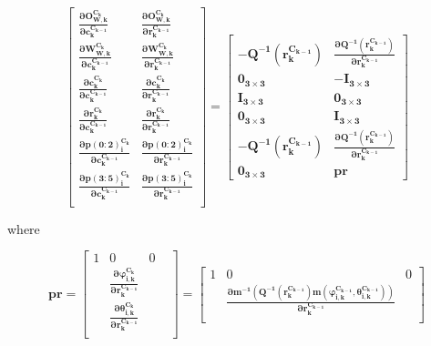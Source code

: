 \begin{equation}
\begin{bmatrix}
\boldsymbol{\frac{\partial O_{W,k}^{C_{k}}}{\partial c_{k}^{C_{k-1}}}} & 
\boldsymbol{\frac{\partial O_{W,k}^{C_{k}}}{\partial r_{k}^{C_{k-1}}}} \\
\boldsymbol{\frac{\partial W_{W,k}^{C_{k}}}{\partial c_{k}^{C_{k-1}}}} &
\boldsymbol{\frac{\partial W_{W,k}^{C_{k}}}{\partial r_{k}^{C_{k-1}}}} \\
\boldsymbol{\frac{\partial c_{k}^{C_{k}}}{\partial c_{k}^{C_{k-1}}}} & 
\boldsymbol{\frac{\partial c_{k}^{C_{k}}}{\partial r_{k}^{C_{k-1}}}} \\
\boldsymbol{\frac{\partial r_{k}^{C_{k}}}{\partial c_{k}^{C_{k-1}}}} & 
\boldsymbol{\frac{\partial r_{k}^{C_{k}}}{\partial r_{k}^{C_{k-1}}}} \\
\boldsymbol{\frac{\partial p(0:2)_{i}^{C_{k}}}{\partial c_{k}^{C_{k-1}}}} & 
\boldsymbol{\frac{\partial p(0:2)_{i}^{C_{k}}}{\partial r_{k}^{C_{k-1}}}} \\
\boldsymbol{\frac{\partial p(3:5)_{i}^{C_{k}}}{\partial c_{k}^{C_{k-1}}}} & 
\boldsymbol{\frac{\partial p(3:5)_{i}^{C_{k}}}{\partial r_{k}^{C_{k-1}}}} \\
\end{bmatrix}= \begin{bmatrix}
-\boldsymbol{Q^{-1}(r_{k}^{C_{k-1}})} & 
\boldsymbol{\frac{\partial Q^{-1}(r_{k}^{C_{k-1}})}{\partial r_{k}^{C_{k-1}}}} \\
\boldsymbol{0_{3\times 3}} & -\boldsymbol{I_{3\times 3}} \\
\boldsymbol{I_{3\times 3}} & \boldsymbol{0_{3\times 3}} \\
\boldsymbol{0_{3\times 3}} & \boldsymbol{I_{3\times 3}} \\
\boldsymbol{-Q^{-1}(r_{k}^{C_{k-1}})} & 
\boldsymbol{\frac{\partial Q^{-1}(r_{k}^{C_{k-1}})}{\partial r_{k}^{C_{k-1}}}} \\
\boldsymbol{0_{3\times 3}} & \boldsymbol{pr} 
\end{bmatrix}
\end{equation}

\noindent where

\begin{equation}
\boldsymbol{pr}=\begin{bmatrix}
1 & 0 & 0 & \\
&\boldsymbol{\frac{\partial \varphi _{i, k}^{C_k}}{\partial r_{k}^{C_{k-1}}}} & \\
&\boldsymbol{\frac{\partial \theta _{i, k}^{C_k}}{\partial r_{k}^{C_{k-1}}}} & \\
\end{bmatrix}= \begin{bmatrix}
1 & 0 & 0 \\
&\boldsymbol{\frac{\partial m^{-1}(Q^{-1}(r_{k}^{C_{k-1}})m(\varphi _{i, 
k}^{C_{k-1}}, \theta _{i, k}^{C_{k-1}}))}{\partial r_{k}^{C_{k-1}}}} & \\
\end{bmatrix}
\end{equation}

